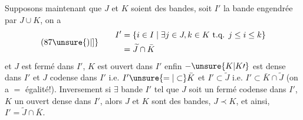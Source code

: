 Supposons maintenant que $J$ et $K$ soient des bandes,  soit $I'$ la bande engendrée par $J\cup K$, on a
\[
(87\unsure{)|]}\qquad\begin{aligned}
I'&=\{i\in I\mid\exists j\in J,k\in K\text{ t.q. }j\leq i\leq k\}\\
&=\widetilde J\cap\bar K
\end{aligned}
\]
et $J$ est fermé dans $I'$, $K$ est ouvert dans $I'$ enfin  $-\unsure{K|K\prime}$ est dense dans $I'$ et $J$ codense dans $I'$ i.e. $I'\unsure{=|\subset}\bar K$ et $I'\subset\widetilde J$  i.e. $I'\subset\bar K\cap\widetilde J$ (on a $=$ égalité!). Inversement si $\exists$ bande $I'$ tel que $J$ soit un fermé codense dans $I'$, $K$ un ouvert dense dans $I'$, alors $J$ et $K$ sont des bandes, $J\prec K$, et ainsi, $I'=\widetilde J\cap\bar K$.

